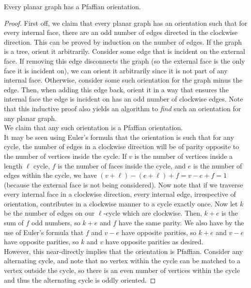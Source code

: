 


\begin{ftheo}
	Every planar graph has a Pfaffian orientation.
\end{ftheo}
\begin{proof}
	First off, we claim that every planar graph has an orientation such that for every internal face, there are an odd number of edges directed in the clockwise direction. This can be proved by induction on the number of edges. If the graph is a tree, orient it arbitrarily. Consider some edge that is incident on the external face. If removing this edge disconnects the graph (so the external face is the only face it is incident on), we can orient it arbitrarily since it is not part of any internal face. Otherwise, consider some such orientation for the graph minus the edge. Then, when adding this edge back, orient it in a way that ensures the internal face the edge is incident on has an odd number of clockwise edges. Note that this inductive proof also yields an algorithm to \emph{find} such an orientation for any planar graph.\\
	We claim that any such orientation is a Pfaffian orientation.\\
	It may be seen using Euler's formula that the orientation is such that for any cycle, the number of edges in a clockwise direction will be of parity opposite to the number of vertices inside the cycle. If $v$ is the number of vertices inside a length $\ell$ cycle, $f$ is the number of faces inside the cycle, and $e$ is the number of edges within the cycle, we have $(v+\ell)-(e+\ell)+f = v-e+f = 1$ (because the external face is not being considered). Now note that if we traverse every internal face in a clockwise direction, every internal edge, irrespective of orientation, contributes in a clockwise manner to a cycle exactly once. Now let $k$ be the number of edges on our $\ell$-cycle which are clockwise. Then, $k+e$ is the sum of $f$ odd numbers, so $k+e$ and $f$ have the same parity. We also have by the use of Euler's formula that $f$ and $v-e$ have opposite parities, so $k+e$ and $v-e$ have opposite parities, so $k$ and $v$ have opposite parities as desired. \\
	However, this near-directly implies that the orientation is Pfaffian. Consider any alternating cycle, and note that no vertex within the cycle can be matched to a vertex outside the cycle, so there is an even number of vertices within the cycle and thus the alternating cycle is oddly oriented.
\end{proof}

